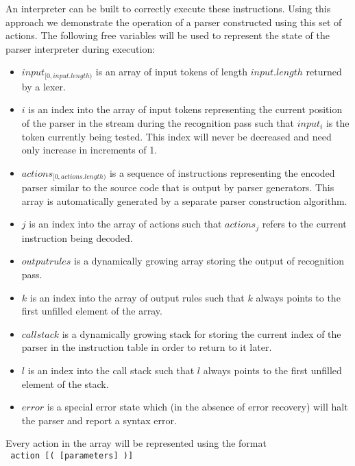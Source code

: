 \documentclass[a4paper,11pt]{article}
\begin{document}
An interpreter can be built to correctly execute these instructions. 
Using this approach we demonstrate the operation of a parser constructed using this set of actions.
The following free variables will be used to represent the state of the parser interpreter during execution:

\begin{itemize}
\item $input_{[0, input.length)}$ is an array of input tokens of length $input.length$ returned by a lexer.
\item $i$ is an index into the array of input tokens representing the current position of the parser in the stream during the recognition pass such that $input_i$ is the token currently being tested.
This index will never be decreased and need only increase in increments of 1.
\item $actions_{[0, actions.length)}$ is a sequence of instructions representing the encoded parser similar to the source code that is output by parser generators. 
This array is automatically generated by a separate parser construction algorithm.
\item $j$ is an index into the array of actions such that $actions_j$ refers to the current instruction being decoded.
\item $outputrules$ is a dynamically growing array storing the output of recognition pass.
\item $k$ is an index into the array of output rules such that $k$ always points to the first unfilled element of the array.
\item $callstack$ is a dynamically growing stack for storing the current index of the parser in the instruction table in order to return to it later.
\item $l$ is an index into the call stack such that $l$ always points to the first unfilled element of the stack.
\item $error$ is a special error state which (in the absence of error recovery) will halt the parser and report a syntax error.
\end{itemize}

Every action in the array will be represented using the format\\ \texttt{ action [( [parameters\textellipsis] )]}\\
\end{document}
